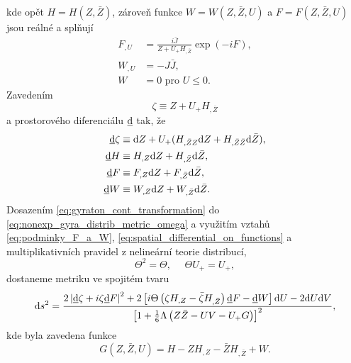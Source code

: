 kde opět $H = H(Z, \bar{Z})$, zároveň funkce $W = W(Z, \bar{Z}, U)$ a $F = F(Z, \bar{Z}, U)$ jsou reálné a splňují
\begin{equation}
    \label{eq:podminky_F_a_W}
    \begin{split}
        F_{,U} &= \frac{i\bar{J}}{Z + U_{+}H_{,\bar{Z}}} \exp{\left(-iF\right)}, \\
        W_{,U} &= -J \bar{J}, \\
        W &= 0 \text{ pro } U \leq 0.
    \end{split}
\end{equation}
Zavedením
\begin{equation}
    \zeta \equiv Z + U_{+} H_{,\bar{Z}}
\end{equation}
a prostorového diferenciálu $\underline{\mathrm{d}}$ tak, že
\begin{equation}
    \label{eq:spatial_differential_on_functions}
    \begin{split}
        \underline{\mathrm{d}}\zeta &\equiv \mathrm{d} Z + U_{+}(H_{,\bar{Z}Z}\mathrm{d} Z + H_{,\bar{Z}\bar{Z}}\mathrm{d} \bar{Z}), \\
        \underline{\mathrm{d}}H &\equiv H_{,Z}\mathrm{d} Z + H_{,\bar{Z}}\mathrm{d} \bar{Z}, \\
        \underline{\mathrm{d}}F &\equiv F_{,Z}\mathrm{d} Z + F_{,\bar{Z}}\mathrm{d} \bar{Z}, \\
        \underline{\mathrm{d}}W &\equiv W_{,Z}\mathrm{d} Z + W_{,\bar{Z}}\mathrm{d} \bar{Z}.
    \end{split}
\end{equation}
Dosazením \eqref{eq:gyraton_cont_transformation} do \eqref{eq:nonexp_gyra_distrib_metric_omega} a využitím vztahů \eqref{eq:podminky_F_a_W},
\eqref{eq:spatial_differential_on_functions} a multiplikativních pravidel z nelineární teorie distribucí,
\begin{equation}
    \Theta^2 = \Theta, ~~~~~~ \Theta U_{+} = U_{+},
\end{equation}
dostaneme metriku ve spojitém tvaru
\begin{equation}
    \label{eq:spojita_gyratonova_metrika}
    \mathrm{d} s^2 = \frac{2 \left|\underline{\mathrm{d}} \zeta + i \zeta \underline{\mathrm{d}}F\right|^2 + 2 \left[i \Theta\left(\zeta H_{,Z} - \bar{\zeta} H_{,\bar{Z}}\right) \underline{\mathrm{d}}F - \underline{\mathrm{d}}W\right] \mathrm{d} U - 2\mathrm{d} U \mathrm{d} V}{\left[1+\frac{1}{6}\Lambda\left(Z \bar{Z} - UV - U_{+}G\right)\right]^2},
\end{equation}
kde byla zavedena funkce
\begin{equation}
    G \left( Z, \bar{Z}, U \right) = H - Z H_{,Z} - \bar{Z} H_{,\bar{Z}} + W.
\end{equation}

